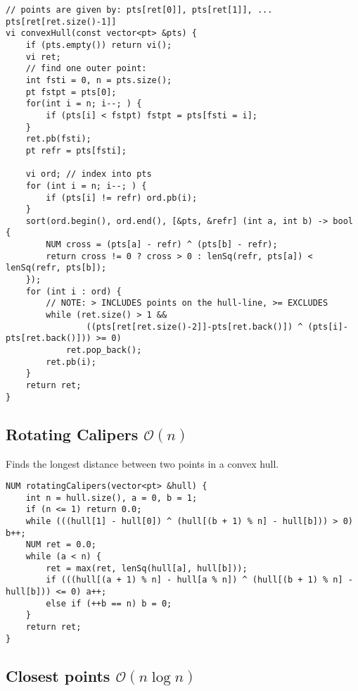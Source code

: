 \documentclass{article}
\begin{document}
\begin{lstlisting}
// points are given by: pts[ret[0]], pts[ret[1]], ... pts[ret[ret.size()-1]]
vi convexHull(const vector<pt> &pts) {
	if (pts.empty()) return vi();
	vi ret;
	// find one outer point:
	int fsti = 0, n = pts.size();
	pt fstpt = pts[0];
	for(int i = n; i--; ) {
		if (pts[i] < fstpt) fstpt = pts[fsti = i];
	}
	ret.pb(fsti);
	pt refr = pts[fsti];

	vi ord; // index into pts
	for (int i = n; i--; ) {
		if (pts[i] != refr) ord.pb(i);
	}
	sort(ord.begin(), ord.end(), [&pts, &refr] (int a, int b) -> bool {
		NUM cross = (pts[a] - refr) ^ (pts[b] - refr);
		return cross != 0 ? cross > 0 : lenSq(refr, pts[a]) < lenSq(refr, pts[b]);
	});
	for (int i : ord) {
		// NOTE: > INCLUDES points on the hull-line, >= EXCLUDES
		while (ret.size() > 1 &&
				((pts[ret[ret.size()-2]]-pts[ret.back()]) ^ (pts[i]-pts[ret.back()])) >= 0)
			ret.pop_back();
		ret.pb(i);
	}
	return ret;
}
\end{lstlisting}

\subsection{Rotating Calipers $\mathcal{O}(n)$}

Finds the longest distance between two points in a convex hull.

\begin{lstlisting}
NUM rotatingCalipers(vector<pt> &hull) {
	int n = hull.size(), a = 0, b = 1;
	if (n <= 1) return 0.0;
	while (((hull[1] - hull[0]) ^ (hull[(b + 1) % n] - hull[b])) > 0) b++;
	NUM ret = 0.0;
	while (a < n) {
		ret = max(ret, lenSq(hull[a], hull[b]));
		if (((hull[(a + 1) % n] - hull[a % n]) ^ (hull[(b + 1) % n] - hull[b])) <= 0) a++;
		else if (++b == n) b = 0;
	}
	return ret;
}
\end{lstlisting}

\subsection{Closest points $\mathcal{O}(n \log n)$}
\end{document}

